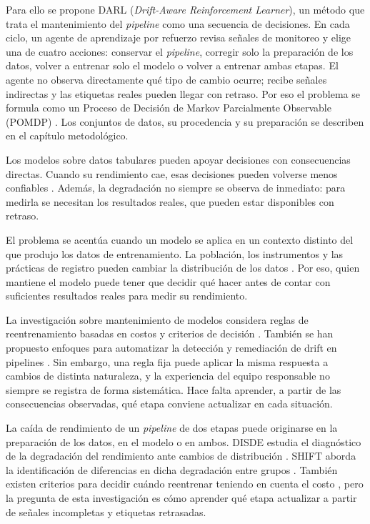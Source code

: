 Para ello se propone DARL (\textit{Drift-Aware Reinforcement Learner}), un método que trata
el mantenimiento del \textit{pipeline} como una secuencia de decisiones. En cada ciclo, un
agente de aprendizaje por refuerzo revisa señales de monitoreo y elige una de cuatro
acciones: conservar el \textit{pipeline}, corregir solo la preparación de los datos, volver
a entrenar solo el modelo o volver a entrenar ambas etapas. El agente no observa
directamente qué tipo de cambio ocurre; recibe señales indirectas y las etiquetas reales
pueden llegar con retraso. Por eso el problema se formula como un Proceso de Decisión de
Markov Parcialmente Observable (POMDP) \cite{kaelbling1998pomdp}. Los conjuntos de datos,
su procedencia y su preparación se describen en el capítulo metodológico.



Los modelos sobre datos tabulares pueden apoyar decisiones con consecuencias directas.
Cuando su rendimiento cae, esas decisiones pueden volverse menos confiables
\cite{gardner2023tableshift}. Además, la degradación no siempre se observa de inmediato:
para medirla se necesitan los resultados reales, que pueden estar disponibles con retraso.

El problema se acentúa cuando un modelo se aplica en un contexto distinto del que produjo
los datos de entrenamiento. La población, los instrumentos y las prácticas de registro
pueden cambiar la distribución de los datos \cite{morenotorres2012shift}. Por eso, quien
mantiene el modelo puede tener que decidir qué hacer antes de contar con suficientes
resultados reales para medir su rendimiento.

La investigación sobre mantenimiento de modelos considera reglas de reentrenamiento basadas
en costos y criterios de decisión \cite{mahadevan2024cost}. También se han propuesto
enfoques para automatizar la detección y remediación de drift en pipelines
\cite{tanna2025selfhealing}. Sin embargo, una regla fija puede aplicar la misma respuesta a
cambios de distinta naturaleza, y la experiencia del equipo responsable no siempre se
registra de forma sistemática. Hace falta aprender, a partir de las consecuencias
observadas, qué etapa conviene actualizar en cada situación.



La caída de rendimiento de un \textit{pipeline} de dos etapas puede originarse en la
preparación de los datos, en el modelo o en ambos. DISDE estudia el diagnóstico de la
degradación del rendimiento ante cambios de distribución \cite{cai2023disde}. SHIFT aborda
la identificación de diferencias en dicha degradación entre grupos
\cite{singh2025shift}. También existen criterios para decidir cuándo reentrenar teniendo
en cuenta el costo \cite{mahadevan2024cost}, pero la pregunta de esta investigación es cómo
aprender qué etapa actualizar a partir de señales incompletas y etiquetas retrasadas.

